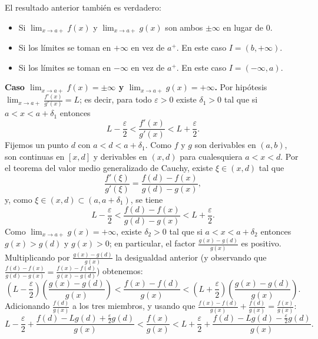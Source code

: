 \begin{remark}
     El resultado anterior también es verdadero:
     \begin{itemize}
         \item Si $\lim_{x\to a+} f( x)$ y $\lim_{x\to a+} g( x)$ son ambos $\pm \infty$ en lugar de $0$.
         \item Si los límites se toman en $+\infty$ en vez de $a^+$. En este caso $I = ( b,+\infty )$.
         \item Si los límites se toman en $-\infty$ en vez de $a^+$. En este caso $I = ( -\infty,a )$.
     \end{itemize}
\end{remark}

\begin{prueba}
    \textbf{Caso $\lim_{x\to a+} f( x)=\pm\infty$ y $\lim_{x\to a+} g( x)=+ \infty$.}
    Por hipótesis $\lim_{x\to a+}\frac{f'( x)}{g'( x)} =L$; es decir, para todo $\varepsilon > 0$ existe $\delta_{1} > 0$ tal que si $a< x< a+ \delta_{1}$ entonces
    \[
    L-\frac{\varepsilon }{2} < \frac{f'( x)}{g'( x)} < L+\frac{\varepsilon }{2}.
    \]
    Fijemos un punto $d$ con $a< d< a+\delta_{1}$. Como $f$ y $g$ son derivables en $(a,b)$, son continuas en $[x,d]$ y derivables en $(x,d)$ para cualesquiera $a< x< d$. Por el teorema del valor medio generalizado de Cauchy, existe $\xi \in ( x,d)$ tal que
    \[
    \frac{f'( \xi )}{g'( \xi )} =\frac{f( d) -f( x)}{g( d) -g( x)},
    \]
    y, como $\xi \in (x,d) \subset ( a,a+ \delta _{1})$, se tiene
    \[
    L-\frac{\varepsilon }{2} < \frac{f( d) -f( x)}{g( d) -g( x)} < L+\frac{\varepsilon }{2}.
    \]
    Como $\lim_{x\to a+} g( x) =+ \infty$, existe $\delta_{2} > 0$ tal que si $a< x< a+ \delta _{2}$ entonces $g( x) > g( d)$ y $g( x) > 0$; en particular, el factor $\frac{g( x) -g( d)}{g( x)}$ es positivo. Multiplicando por $\frac{g( x) -g( d)}{g( x)}$ la desigualdad anterior (y observando que $\frac{f( d) -f( x)}{g( d) -g( x)}=\frac{f( x) -f( d)}{g( x) -g( d)}$) obtenemos:
    \begin{equation*}
    \left( L-\frac{\varepsilon }{2}\right)\left(\frac{g( x) -g( d)}{g( x)}\right) < \frac{f( x) -f( d)}{g( x)} < \left( L+\frac{\varepsilon }{2}\right)\left(\frac{g( x) -g( d)}{g( x)}\right).
    \end{equation*}
    Adicionando $\frac{f( d)}{g( x)}$ a los tres miembros, y usando que $\frac{f( x) -f( d)}{g( x)}+\frac{f( d)}{g( x)}=\frac{f( x)}{g( x)}$:
    \begin{equation*}
    L-\frac{\varepsilon }{2} +\frac{f( d) -Lg( d) +\frac{\varepsilon }{2} g( d)}{g( x)} < \frac{f( x)}{g( x)} < L+\frac{\varepsilon }{2} +\frac{f( d) -Lg( d) -\frac{\varepsilon }{2} g( d)}{g( x)}.

\end{equation*}
\end{prueba}
